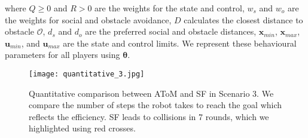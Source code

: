 where $Q \geq 0$ and $R > 0$ are the weights for the state and control, $w_{s}$ and $w_{o}$ are the weights for social and obstacle avoidance, $D$ calculates the closest distance to obstacle $\mathcal{O}$, 
$d_{s}$ and $d_{o}$ are the preferred social and obstacle distances, $\boldsymbol{x}_{min}$, $\boldsymbol{x}_{max}$, $\boldsymbol{u}_{min}$, and $\boldsymbol{u}_{max}$ are the state and control limits.
We represent these behavioural parameters for all players using $\boldsymbol{\theta}$.

\begin{figure}
    \centering
    \texttt{[image: quantitative\_3.jpg]}
    \vspace{-8mm}
    \caption{Quantitative comparison between AToM and SF in Scenario 3. We compare the number of steps the robot takes to reach the goal which reflects the efficiency. SF leads to collisions in 7 rounds, which we highlighted using red crosses.}
    \vspace{-5mm}
    \label{fig:quantitative_3}
\end{figure}


